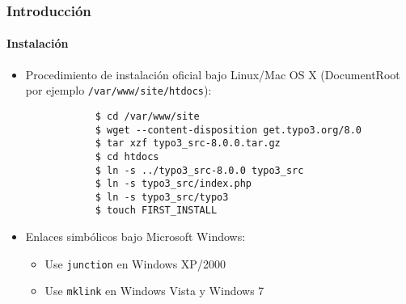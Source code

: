 \begin{frame}[fragile]
	\frametitle{Introducción}
	\framesubtitle{Instalación}

	\begin{itemize}
		\item Procedimiento de instalación oficial bajo Linux/Mac OS X\newline
			(DocumentRoot por ejemplo \texttt{/var/www/site/htdocs}):
		\begin{lstlisting}
			$ cd /var/www/site
			$ wget --content-disposition get.typo3.org/8.0
			$ tar xzf typo3_src-8.0.0.tar.gz
			$ cd htdocs
			$ ln -s ../typo3_src-8.0.0 typo3_src
			$ ln -s typo3_src/index.php
			$ ln -s typo3_src/typo3
			$ touch FIRST_INSTALL
		\end{lstlisting}

		\item Enlaces simbólicos bajo Microsoft Windows:

			\begin{itemize}
				\item Use \texttt{junction} en Windows XP/2000
				\item Use \texttt{mklink} en Windows Vista y Windows 7
			\end{itemize}

	\end{itemize}
\end{frame}


